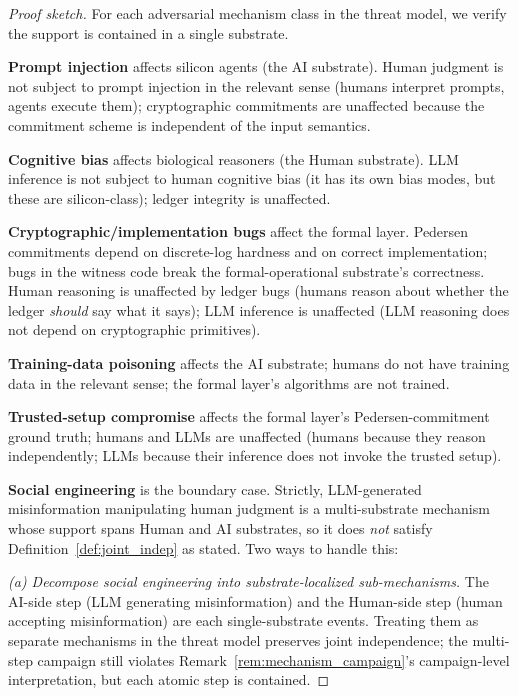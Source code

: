 \begin{proof}[Proof sketch]
For each adversarial mechanism class in the threat model, we verify
the support is contained in a single substrate.

\textbf{Prompt injection} affects silicon agents (the AI substrate).
Human judgment is not subject to prompt injection in the relevant
sense (humans interpret prompts, agents execute them); cryptographic
commitments are unaffected because the commitment scheme is
independent of the input semantics.

\textbf{Cognitive bias} affects biological reasoners (the Human
substrate). LLM inference is not subject to human cognitive bias
(it has its own bias modes, but these are silicon-class); ledger
integrity is unaffected.

\textbf{Cryptographic/implementation bugs} affect the formal layer.
Pedersen commitments depend on discrete-log hardness and on
correct implementation; bugs in the witness code break the
formal-operational substrate's correctness. Human reasoning is
unaffected by ledger bugs (humans reason about whether the ledger
\emph{should} say what it says); LLM inference is unaffected (LLM
reasoning does not depend on cryptographic primitives).

\textbf{Training-data poisoning} affects the AI substrate; humans
do not have training data in the relevant sense; the formal layer's
algorithms are not trained.

\textbf{Trusted-setup compromise} affects the formal layer's
Pedersen-commitment ground truth; humans and LLMs are unaffected
(humans because they reason independently; LLMs because their
inference does not invoke the trusted setup).

\textbf{Social engineering} is the boundary case. Strictly,
LLM-generated misinformation manipulating human judgment is a
multi-substrate mechanism whose support spans Human and AI
substrates, so it does \emph{not} satisfy
Definition~\ref{def:joint_indep} as stated. Two ways to handle this:

\emph{(a) Decompose social engineering into substrate-localized
sub-mechanisms.} The AI-side step (LLM generating misinformation)
and the Human-side step (human accepting misinformation) are each
single-substrate events. Treating them as separate mechanisms in
the threat model preserves joint independence; the multi-step
campaign still violates Remark~\ref{rem:mechanism_campaign}'s
campaign-level interpretation, but each atomic step is contained.


\end{proof}
